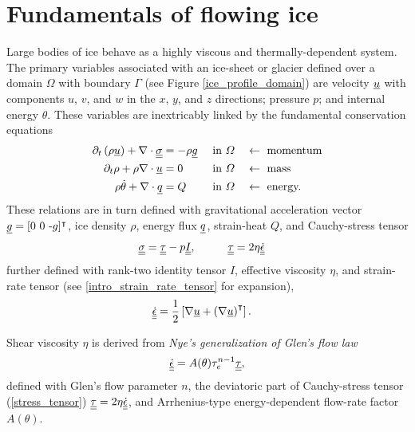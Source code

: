 
\chapter{Fundamentals of flowing ice}

Large bodies of ice behave as a highly viscous and thermally-dependent system.  The primary variables associated with an ice-sheet or glacier defined over a domain $\Omega$ with boundary $\Gamma$ (see Figure \ref{ice_profile_domain}) are velocity $\underline{u}$ with components $u$, $v$, and $w$ in the $x$, $y$, and $z$ directions; pressure $p$; and internal energy $\theta$.  These variables are inextricably linked by the fundamental conservation equations 
\begin{align}
  \label{cons_momentum}
  \partial_t \left(\rho \underline{u} \right) + \nabla \cdot \underline{\underline{\sigma}} &= -\rho\underline{g} &&\text{ in } \varOmega &&\leftarrow \text{ momentum} \\
  \label{cons_mass}
  \partial_t \rho + \rho \nabla \cdot \underline{u} &= 0 &&\text{ in } \varOmega &&\leftarrow \text{ mass}  \\
  \label{cons_energy}
  \rho \dot{\theta} + \nabla \cdot \underline{q}  &= Q &&\text{ in } \varOmega &&\leftarrow \text{ energy.}
\end{align}
These relations are in turn defined with gravitational acceleration vector $\underline{g}=[0\ 0\ \text{-}g]^\intercal$, ice density $\rho$, energy flux $\underline{q}$, strain-heat $Q$, and   Cauchy-stress tensor
\begin{align}
  \label{stress_tensor}
  \ranktwo{\sigma} &= \ranktwo{\tau} - p \ranktwo{I}, \hspace{10mm} \ranktwo{\tau} = 2\eta\ranktwo{\dot{\epsilon}}
\end{align}
further defined with rank-two identity tensor $I$, effective viscosity $\eta$, and  strain-rate tensor (see \ref{intro_strain_rate_tensor} for expansion),
\begin{align}
  \label{strain_rate_tensor}
  \underline{\underline{\dot{\epsilon}}} 
  &= \frac{1}{2} \left[ \nabla \underline{u} + \left(\nabla \underline{u} \right)^\intercal \right].
\end{align}

Shear viscosity $\eta$ is derived from  \emph{Nye's generalization of Glen's flow law} \citep{glen_1952, nye_1957} 
\begin{align}
  \label{nye}
  \underline{\underline{\dot{\epsilon}}} = A(\theta) \tau_e^{n-1} \underline{\underline{\tau}},
\end{align}
defined with Glen's flow parameter $n$, the deviatoric part of Cauchy-stress tensor (\ref{stress_tensor}) $\underline{\underline{\tau}} = 2\eta \underline{\underline{\dot{\epsilon}}}$, and Arrhenius-type energy-dependent flow-rate factor $A(\theta)$.

